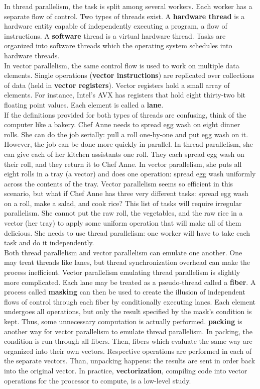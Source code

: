 \documentclass{article}
\begin{document}
    In thread parallelism, the task is split among several workers. Each worker has a separate flow of control. Two types of threads exist. A \textbf{hardware thread} is a hardware entity capable of independently executing a program, a flow of instructions. A \textbf{software} thread is a virtual hardware thread. Tasks are organized into software threads which the operating system schedules into hardware threads. \\

    In vector parallelism, the same control flow is used to work on multiple data elements. Single operations (\textbf{vector instructions}) are replicated over collections of data (held in \textbf{vector registers}). Vector registers hold a small array of elements. For instance, Intel's AVX has registers that hold eight thirty-two bit floating point values. Each element is called a \textbf{lane}. \\

    If the definitions provided for both types of threads are confusing, think of the computer like a bakery. Chef Anne needs to spread egg wash on eight dinner rolls. She can do the job serially: pull a roll one-by-one and put egg wash on it. However, the job can be done more quickly in parallel. In thread parallelism, she can give each of her kitchen assistants one roll. They each spread egg wash on their roll, and they return it to Chef Anne. In vector parallelism, she puts all eight rolls in a tray (a vector) and does one operation: spread egg wash uniformly across the contents of the tray. Vector parallelism seems so efficient in this scenario, but what if Chef Anne has three very different tasks: spread egg wash on a roll, make a salad, and cook rice? This list of tasks will require irregular parallelism. She cannot put the raw roll, the vegetables, and the raw rice in a vector (her tray) to apply some uniform operation that will make all of them delicious. She needs to use thread parallelism: one worker will have to take each task and do it independently.\\

    Both thread parallelism and vector parallelism can emulate one another. One may treat threads like lanes, but thread synchronization overhead can make the process inefficient. Vector parallelism emulating thread parallelism is slightly more complicated. Each lane may be treated as a pseudo-thread called a \textbf{fiber}. A process called \textbf{masking} can then be used to create the illusion of independent flows of control through each fiber by conditionally executing lanes. Each element undergoes all operations, but only the result specified by the mask's condition is kept. Thus, some unnecessary computation is actually performed. \textbf{packing} is another way for vector parallelism to emulate thread parallelism. In packing, the condition is run through all fibers. Then, fibers which evaluate the same way are organized into their own vectors. Respective operations are performed in each of the separate vectors. Than, unpacking happens: the results are sent in order back into the original vector. In practice, \textbf{vectorization}, compiling code into vector operations for the processor to compute, is a low-level study. \\
\end{document}
